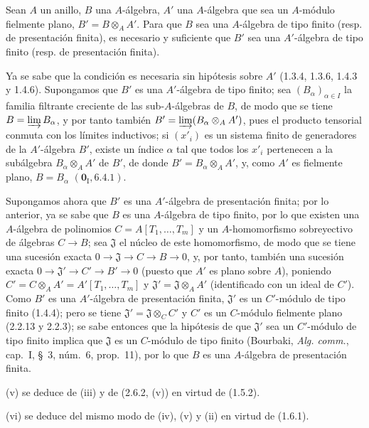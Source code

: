 \begin{lemma}[2.7.1.1]
\label{IV.2.7.1.1-fr}
Sean $A$ un anillo, $B$ una $A$-álgebra, $A'$ una $A$-álgebra que sea un
$A$-módulo fielmente plano, $B'=B\otimes_A A'$. Para que $B$ sea una
$A$-álgebra de tipo finito \textup{(resp.} de presentación finita\textup{)}, es necesario y
suficiente que $B'$ sea una $A'$-álgebra de tipo finito \textup{(resp.} de presentación
finita\textup{)}.
\end{lemma}

Ya se sabe que la condición es necesaria sin hipótesis sobre $A'$ (1.3.4,
1.3.6, 1.4.3 y 1.4.6). Supongamos que $B'$ es una $A'$-álgebra de tipo finito;
sea $(B_\alpha)_{\alpha\in I}$ la familia filtrante creciente de las
sub-$A$-álgebras de $B$, de modo que se tiene $B=\varinjlim B_\alpha$, y por
tanto también $B'=\varinjlim(B_\alpha\otimes_A A')$, pues el producto tensorial
conmuta con los límites inductivos; si $(x'_i)$ es un sistema finito de
generadores de la $A'$-álgebra $B'$, existe un índice $\alpha$ tal que todos
los $x'_i$ pertenecen a la subálgebra $B_\alpha\otimes_A A'$ de $B'$, de donde
$B'=B_\alpha\otimes_A A'$, y, como $A'$ es fielmente plano,
$B=B_\alpha$ $(\mathbf{0}_{\mathrm I},6.4.1)$.

Supongamos ahora que $B'$ es una $A'$-álgebra de presentación finita; por lo
anterior, ya se sabe que $B$ es una $A$-álgebra de tipo finito, por lo que
existen una $A$-álgebra de polinomios $C=A[T_1,\ldots,T_m]$ y un
$A$-homomorfismo sobreyectivo de álgebras $C\to B$; sea $\mathfrak J$ el
núcleo de este homomorfismo, de modo que se tiene una sucesión exacta
$0\to\mathfrak J\to C\to B\to0$,
y, por tanto, también una sucesión exacta
$0\to\mathfrak J'\to C'\to B'\to0$ (puesto que $A'$ es plano sobre $A$),
poniendo $C'=C\otimes_A A'=A'[T_1,\ldots,T_m]$ y
$\mathfrak J'=\mathfrak J\otimes_A A'$ (identificado con un ideal de $C'$).
Como $B'$ es una $A'$-álgebra de presentación finita, $\mathfrak J'$ es un
$C'$-módulo de tipo finito (1.4.4); pero se tiene
$\mathfrak J'=\mathfrak J\otimes_C C'$ y $C'$ es un $C$-módulo fielmente
plano (2.2.13 y 2.2.3); se sabe entonces que la hipótesis de que $\mathfrak J'$
sea un $C'$-módulo de tipo finito implica que $\mathfrak J$ es un $C$-módulo
de tipo finito (Bourbaki, \emph{Alg. comm.}, cap.~I,
\S~3, núm.~6, prop.~11), por lo que $B$ es una $A$-álgebra de
presentación finita.

(v) se deduce de (iii) y de (2.6.2, (v)) en virtud de (1.5.2).

(vi) se deduce del mismo modo de (iv), (v) y (ii) en virtud de (1.6.1).

